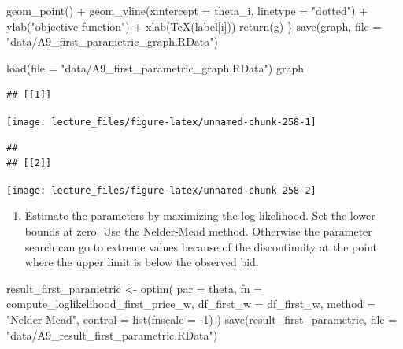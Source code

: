 \documentclass[
]{book}
\newenvironment{Shaded}{\begin{snugshade}}{\end{snugshade}}
\newcommand{\AttributeTok}[1]{\textcolor[rgb]{0.77,0.63,0.00}{#1}}
\newcommand{\DecValTok}[1]{\textcolor[rgb]{0.00,0.00,0.81}{#1}}
\newcommand{\FunctionTok}[1]{\textcolor[rgb]{0.00,0.00,0.00}{#1}}
\newcommand{\NormalTok}[1]{#1}
\newcommand{\OtherTok}[1]{\textcolor[rgb]{0.56,0.35,0.01}{#1}}
\newcommand{\SpecialCharTok}[1]{\textcolor[rgb]{0.00,0.00,0.00}{#1}}
\newcommand{\StringTok}[1]{\textcolor[rgb]{0.31,0.60,0.02}{#1}}
\providecommand{\tightlist}{%
  \setlength{\itemsep}{0pt}\setlength{\parskip}{0pt}}
\begin{document}
\begin{Shaded}
\begin{Highlighting}[]
    \FunctionTok{geom\_point}\NormalTok{() }\SpecialCharTok{+}
    \FunctionTok{geom\_vline}\NormalTok{(}\AttributeTok{xintercept =}\NormalTok{ theta\_i, }\AttributeTok{linetype =} \StringTok{"dotted"}\NormalTok{) }\SpecialCharTok{+}
    \FunctionTok{ylab}\NormalTok{(}\StringTok{"objective function"}\NormalTok{) }\SpecialCharTok{+} \FunctionTok{xlab}\NormalTok{(}\FunctionTok{TeX}\NormalTok{(label[i]))}
  \FunctionTok{return}\NormalTok{(g)}
\NormalTok{\}}
\FunctionTok{save}\NormalTok{(graph, }\AttributeTok{file =} \StringTok{"data/A9\_first\_parametric\_graph.RData"}\NormalTok{)}
\end{Highlighting}
\end{Shaded}

\begin{Shaded}
\begin{Highlighting}[]
\FunctionTok{load}\NormalTok{(}\AttributeTok{file =} \StringTok{"data/A9\_first\_parametric\_graph.RData"}\NormalTok{)}
\NormalTok{graph}
\end{Highlighting}
\end{Shaded}

\begin{verbatim}
## [[1]]
\end{verbatim}

\begin{center}\texttt{[image: lecture\_files/figure-latex/unnamed-chunk-258-1]} \end{center}

\begin{verbatim}
## 
## [[2]]
\end{verbatim}

\begin{center}\texttt{[image: lecture\_files/figure-latex/unnamed-chunk-258-2]} \end{center}

\begin{enumerate}
\def\labelenumi{\arabic{enumi}.}
\setcounter{enumi}{8}
\tightlist
\item
  Estimate the parameters by maximizing the log-likelihood. Set the lower bounds at zero. Use the Nelder-Mead method. Otherwise the parameter search can go to extreme values because of the discontinuity at the point where the upper limit is below the observed bid.
\end{enumerate}

\begin{Shaded}
\begin{Highlighting}[]
\NormalTok{result\_first\_parametric }\OtherTok{\textless{}{-}}
  \FunctionTok{optim}\NormalTok{(}
    \AttributeTok{par =}\NormalTok{ theta,}
    \AttributeTok{fn =}\NormalTok{ compute\_loglikelihood\_first\_price\_w,}
    \AttributeTok{df\_first\_w =}\NormalTok{ df\_first\_w,}
    \AttributeTok{method =} \StringTok{"Nelder{-}Mead"}\NormalTok{,}
    \AttributeTok{control =} \FunctionTok{list}\NormalTok{(}\AttributeTok{fnscale =} \SpecialCharTok{{-}}\DecValTok{1}\NormalTok{)}
\NormalTok{  )}
\FunctionTok{save}\NormalTok{(result\_first\_parametric, }\AttributeTok{file =} \StringTok{"data/A9\_result\_first\_parametric.RData"}\NormalTok{)}
\end{Highlighting}
\end{Shaded}
\end{document}
